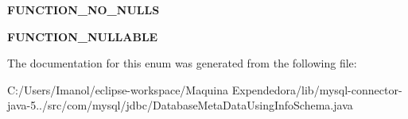 \begin{DoxyCompactItemize}
\mbox{\label{enumcom_1_1mysql_1_1jdbc_1_1_database_meta_data_using_info_schema_1_1_j_d_b_c4_function_constant_af077ba3edd2469680328c09fab064749}} 
{\bfseries F\+U\+N\+C\+T\+I\+O\+N\+\_\+\+N\+O\+\_\+\+N\+U\+L\+LS}
\item 
\mbox{\label{enumcom_1_1mysql_1_1jdbc_1_1_database_meta_data_using_info_schema_1_1_j_d_b_c4_function_constant_a15c1ae2c8a51b4226e2119960e4a5fba}} 
{\bfseries F\+U\+N\+C\+T\+I\+O\+N\+\_\+\+N\+U\+L\+L\+A\+B\+LE}
\end{DoxyCompactItemize}


The documentation for this enum was generated from the following file\+:\begin{DoxyCompactItemize}
\item 
C\+:/\+Users/\+Imanol/eclipse-\/workspace/\+Maquina Expendedora/lib/mysql-\/connector-\/java-\/5../src/com/mysql/jdbc/Database\+Meta\+Data\+Using\+Info\+Schema.\+java\end{DoxyCompactItemize}
